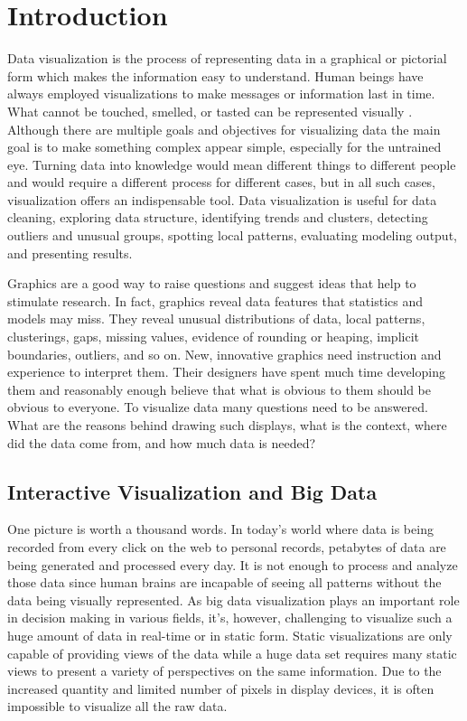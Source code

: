 \section{Introduction}

Data visualization is the process of representing data in a graphical or pictorial form which makes the information easy to understand.  Human beings have always employed visualizations to make messages or information last in time. What cannot be touched, smelled, or tasted can be represented visually \cite{sancho2014approach}.
Although there are multiple goals and objectives for visualizing data the main goal is to make something complex appear simple, especially for the untrained eye. Turning data into knowledge would mean different things to different people and would require a different process for different cases, but in all such cases, visualization offers an indispensable tool. Data visualization is useful for data cleaning, exploring data structure, identifying trends and clusters, detecting outliers and unusual groups, spotting local patterns, evaluating modeling output, and presenting results.

Graphics are a good way to raise questions and suggest ideas that help to stimulate research.
In fact, graphics reveal data features that statistics and models may miss. They reveal unusual distributions of data, local patterns, clusterings, gaps, missing values, evidence of rounding or heaping, implicit boundaries, outliers, and so on.  New, innovative graphics need instruction and experience to interpret them. Their designers have spent much time developing them and reasonably enough believe that what is obvious to them should be obvious to everyone.  To visualize data many questions need to be answered. What are the reasons behind drawing such displays, what is the context, where did the data come from, and how much data is needed? 


 

\subsection{Interactive Visualization and Big Data}

One picture is worth a thousand words. In today's world where data is being recorded from every click on the web to personal records, petabytes of data are being generated and processed every day. It is not enough to process and analyze those data since human brains are incapable of seeing all patterns without the data being visually represented. As big data visualization plays an important role in decision making in various fields, it's, however, challenging to visualize such a huge amount of data in real-time or in static form. Static visualizations are only capable of providing views of the data while a huge data set requires many static views to present a variety of perspectives on the same information. Due to the increased quantity and limited number of pixels in display devices, it is often impossible to visualize all the raw data.





